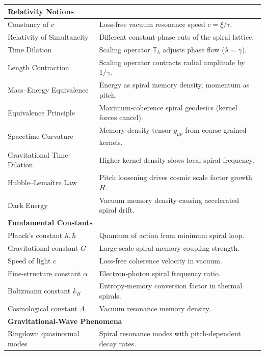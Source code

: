 \begin{table}[H]
\begin{tabular}{p{} p{}}
    \midrule
    \multicolumn{2}{l}{\textbf{Relativity Notions}} \\[-3pt]
    \midrule
    Constancy of $c$ 
      & Loss‐free vacuum resonance speed $c=\xi/\tau$. \\
    Relativity of Simultaneity 
      & Different constant‐phase cuts of the spiral lattice. \\
    Time Dilation 
      & Scaling operator $\mathbb{T}_\lambda$ adjusts phase flow ($\lambda=\gamma$). \\
    Length Contraction 
      & Scaling operator contracts radial amplitude by $1/\gamma$. \\
    Mass–Energy Equivalence 
      & Energy as spiral memory density, momentum as pitch. \\
    Equivalence Principle 
      & Maximum‐coherence spiral geodesics (kernel forces cancel). \\
    Spacetime Curvature 
      & Memory‐density tensor $g_{\mu\nu}$ from coarse‐grained kernels. \\
    Gravitational Time Dilation 
      & Higher kernel density slows local spiral frequency. \\
    Hubble–Lemaître Law 
      & Pitch loosening drives cosmic scale factor growth $H$. \\
    Dark Energy 
      & Vacuum memory density causing accelerated spiral drift. \\[4pt]
    \midrule
    \multicolumn{2}{l}{\textbf{Fundamental Constants}} \\[-3pt]
    \midrule
    Planck’s constant $h,\hbar$ 
      & Quantum of action from minimum spiral loop. \\
    Gravitational constant $G$ 
      & Large‐scale spiral memory coupling strength. \\
    Speed of light $c$ 
      & Loss‐free coherence velocity in vacuum. \\
    Fine‐structure constant $\alpha$ 
      & Electron‐photon spiral frequency ratio. \\
    Boltzmann constant $k_B$ 
      & Entropy‐memory conversion factor in thermal spirals. \\
    Cosmological constant $\Lambda$ 
      & Vacuum resonance memory density. \\[4pt]
    \midrule
    \multicolumn{2}{l}{\textbf{Gravitational‐Wave Phenomena}} \\[-3pt]
    \midrule
    Ringdown quasinormal modes 
      & Spiral resonance modes with pitch‐dependent decay rates. \\

\end{tabular}
\end{table}
